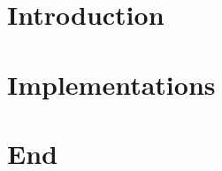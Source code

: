 \section[Intro]{Introduction}



\section[Impl]{Implementations}



% 
% 
% 




\section[End]{End}


